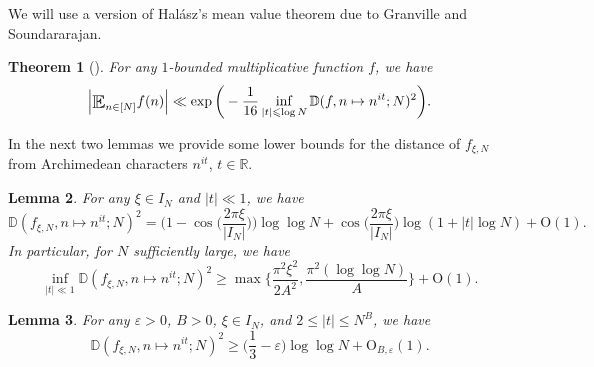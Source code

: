 \documentclass[letter,11pt]{article}
\theoremstyle{plain} %
\newtheorem{theorem}{Theorem}[section]
\newtheorem{lemma}[theorem]{Lemma}
\theoremstyle{definition} %
\theoremstyle{plain}
\theoremstyle{plain}
\theoremstyle{plain}
\numberwithin{equation}{section}
\newcommand{\Halasz}{Hal\'{a}sz}
\newcommand{\Oh}{{\mathrm O}}
\newcommand{\R}{\mathbb{R}}
\renewcommand{\epsilon}{\varepsilon}
\renewcommand{\leq}{\leqslant}
\renewcommand{\geq}{\geqslant}
\newcommand{\Esub}[1]{\raisebox{-0.4ex}{\scalebox{1.4}[1.3]{$\mathbb{E}$}}\raisebox{-0.35ex}{\ensuremath{_{\scriptstyle #1}}}}
\newcommand{\Dist}{\mathbb{D}}
\newcommand{\1}{\mathbbm{1}}
\newcommand{\f}{f_{\xi,N}}
\begin{document}
We will use a version of \Halasz's mean value theorem due to Granville and Soundararajan.

\begin{theorem}[{\cite[Theorem 1.2]{granville2003decay}}]\label{Halasz_GS}
For any $1$-bounded multiplicative function $f$, we have 
$$\Big|\Esub{n\in[N]} f(n)\Big| \ll \exp\bigg(-\frac{1}{16}\inf_{|t|\leq\log{N}}\Dist(f,n\mapsto n^{it};N)^2\bigg).$$
\end{theorem}

In the next two lemmas we provide some lower bounds for the distance of $\f$ from Archimedean characters $n^{it}$, $t\in\R$.

\begin{lemma}\label{dist1}
For any $\xi\in I_N$ and $|t|\ll1$, we have 
\begin{equation}\label{dist1.eq1}
    \Dist(\f,n\mapsto n^{it};N)^2 
    = \bigg(1-\cos\bigg(\frac{2\pi\xi}{|I_N|}\bigg)\bigg)\log\log{N} 
    + \cos\bigg(\frac{2\pi\xi}{|I_N|}\bigg)\log(1+|t|\log{N}) + \Oh(1).
\end{equation}
In particular, for $N$ sufficiently large, we have 
\begin{equation}\label{dist1.eq2}
    \inf_{|t|\ll 1}\Dist(\f,n\mapsto n^{it};N)^2\geq \max\bigg\{\frac{\pi^2\xi^2}{2A^2}, \frac{\pi^2(\log\log{N})}{A}\bigg\} + \Oh(1).
\end{equation}
\end{lemma}

\begin{lemma}\label{dist2}
For any $\epsilon>0$, $B>0$, $\xi\in I_N$, and $2\leq |t|\leq N^B$, we have
\begin{equation}\label{dist2.eq1}
    \Dist(\f,n\mapsto n^{it}; N)^2\geq \bigg(\frac{1}{3}-\epsilon\bigg)\log\log{N}+\Oh_{B,\epsilon}(1).
\end{equation}
\end{lemma}
\end{document}
